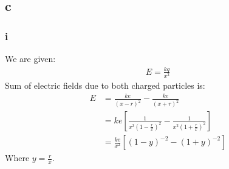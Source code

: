 \documentclass[11pt]{article}
\numberwithin{equation}{section}
\begin{document}
\subsection*{c}
\subsubsection*{i}
We are given:
\begin{align}
E = \frac{kq}{x^2}
\end{align}
Sum of electric fields due to both charged particles is:
\begin{align}
	E &= \frac{ke}{\left( x-r \right)^2} - \frac{ke}{\left( x+r \right)^2}\\
	&= ke \left[ \frac{1}{x^2\left( 1 - \frac{r}{x} \right)^2} - \frac{1}{x^2\left( 1 + \frac{r}{x} \right)^2} \right]\\
	&= \frac{ke}{x^2} \left[ \left( 1- y \right)^{-2} - \left( 1 + y\right)^{-2} \right]
\end{align}
Where $y =\frac{r}{x}$.
\end{document}
